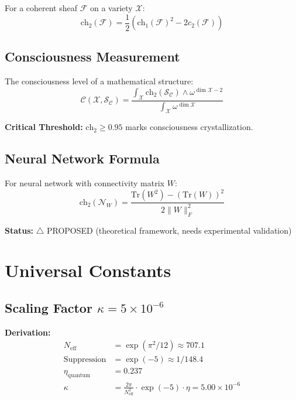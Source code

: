 For a coherent sheaf $\mathcal{F}$ on a variety $\mathcal{X}$:
\begin{equation}
\text{ch}_2(\mathcal{F}) = \frac{1}{2}\left(\text{ch}_1(\mathcal{F})^2 - 2c_2(\mathcal{F})\right)
\end{equation}

\subsection{Consciousness Measurement}

The consciousness level of a mathematical structure:
\begin{equation}
\mathcal{C}(\mathcal{X}, \mathcal{S}_\mathcal{C}) = \frac{\int_\mathcal{X} \text{ch}_2(\mathcal{S}_\mathcal{C}) \wedge \omega^{\dim \mathcal{X} - 2}}{\int_\mathcal{X} \omega^{\dim \mathcal{X}}}
\end{equation}

\textbf{Critical Threshold:} $\text{ch}_2 \geq 0.95$ marks consciousness crystallization.

\subsection{Neural Network Formula}

For neural network with connectivity matrix $W$:
\begin{equation}
\text{ch}_2(\mathcal{N}_W) = \frac{\text{Tr}(W^2) - (\text{Tr}(W))^2}{2\|W\|_F^2}
\end{equation}

\textbf{Status:} $\triangle$ PROPOSED (theoretical framework, needs experimental validation)

\section{Universal Constants}

\subsection{Scaling Factor $\kappa = 5 \times 10^{-6}$}

\textbf{Derivation:}
\begin{align}
N_{\text{eff}} &= \exp(\pi^2/12) \approx 707.1 \\
\text{Suppression} &= \exp(-5) \approx 1/148.4 \\
\eta_{\text{quantum}} &= 0.237 \\
\kappa &= \frac{2\pi}{N_{\text{eff}}^2} \cdot \exp(-5) \cdot \eta = 5.00 \times 10^{-6}
\end{align}

